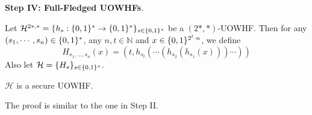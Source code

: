 \noindent\textbf{Step IV: Full-Fledged UOWHFs}. 
\begin{construction}[(a UOWHF)]
Let $\mathcal{H}^{2*, *} = \{h_s:\{0,1\}^{*}\rightarrow\{0,1\}^{*}\}_{s\in\{0,1\}^{*}}$ be a $(2*, *)$-UOWHF. Then for any $(s_1,\cdots,s_n) \in \{0,1\}^*$, any $n, t\in\mathbb{N}$ and $x\in\{0,1\}^{2^t\cdot n}$, we define
\[
    H_{s_1,\dots,s_n}(x)=(t,h_{s_t}(\cdots(h_{s_2}(h_{s_1}(x)))\cdots))
\]
Also let $\mathcal{H} = \{H_s\}_{s \in \{0,1\}^*}$.
\end{construction}
\begin{claim}
    $\mathcal{H}$ is a secure UOWHF.
\end{claim}
The proof is similar to the one in Step II.\\
